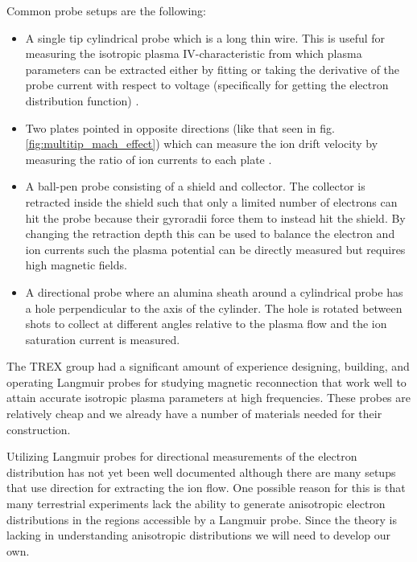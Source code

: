 Common probe setups are the following:
\begin{itemize}
    \item A single tip cylindrical probe which is a long thin wire. This is useful for measuring the isotropic plasma IV-characteristic from which plasma parameters can be extracted either by fitting or taking the derivative of the probe current with respect to voltage (specifically for getting the electron distribution function) \cite{Godyak_Demidov_2011}.
    \item Two plates pointed in opposite directions (like that seen in fig. \ref{fig:multitip_mach_effect}) which can measure the ion drift velocity by measuring the ratio of ion currents to each plate \cite{Chung_2012}.
    \item A ball-pen probe consisting of a shield and collector. The collector is retracted inside the shield such that only a limited number of electrons can hit the probe because their gyroradii force them to instead hit the shield. By changing the retraction depth this can be used to balance the electron and ion currents such the plasma potential can be directly measured but requires high magnetic fields. %
    \item A directional probe where an alumina sheath around a cylindrical probe has a hole perpendicular to the axis of the cylinder. The hole is rotated between shots to collect at different angles relative to the plasma flow and the ion saturation current is measured. %
\end{itemize}

The TREX group had a significant amount of experience designing, building, and operating Langmuir probes for studying magnetic reconnection that work well to attain accurate isotropic plasma parameters at high frequencies. These probes are relatively cheap and we already have a number of materials needed for their construction.

Utilizing Langmuir probes for directional measurements of the electron distribution has not yet been well documented although there are many setups that use direction for extracting the ion flow. One possible reason for this is that many terrestrial experiments lack the ability to generate anisotropic electron distributions in the regions accessible by a Langmuir probe. Since the theory is lacking in understanding anisotropic distributions we will need to develop our own. 



